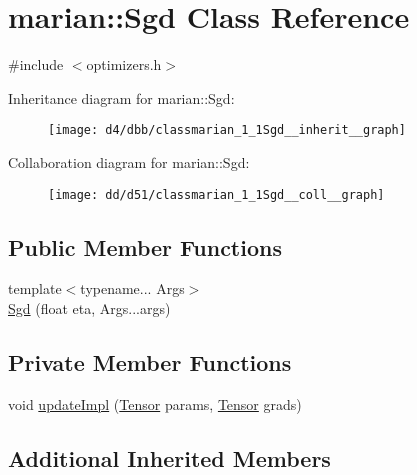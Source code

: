 \hypertarget{classmarian_1_1Sgd}{}\section{marian\+:\+:Sgd Class Reference}
\label{classmarian_1_1Sgd}


{\ttfamily \#include $<$optimizers.\+h$>$}



Inheritance diagram for marian\+:\+:Sgd\+:
\nopagebreak
\begin{figure}[H]
\begin{center}
\leavevmode
\texttt{[image: d4/dbb/classmarian\_1\_1Sgd\_\_inherit\_\_graph]}
\end{center}
\end{figure}


Collaboration diagram for marian\+:\+:Sgd\+:
\nopagebreak
\begin{figure}[H]
\begin{center}
\leavevmode
\texttt{[image: dd/d51/classmarian\_1\_1Sgd\_\_coll\_\_graph]}
\end{center}
\end{figure}
\subsection*{Public Member Functions}
\begin{DoxyCompactItemize}
\item 
{\footnotesize template$<$typename... Args$>$ }\\\hyperlink{classmarian_1_1Sgd_a52cb732a0651ad0ecd39cd1829b6938e}{Sgd} (float eta, Args...\+args)
\end{DoxyCompactItemize}
\subsection*{Private Member Functions}
\begin{DoxyCompactItemize}
\item 
void \hyperlink{classmarian_1_1Sgd_a8a74cc7115e1aafcb67d013b37c8f1ec}{update\+Impl} (\hyperlink{namespacemarian_a88b71ec34bb354564cddc24eb80f7e14}{Tensor} params, \hyperlink{namespacemarian_a88b71ec34bb354564cddc24eb80f7e14}{Tensor} grads)
\end{DoxyCompactItemize}
\subsection*{Additional Inherited Members}


